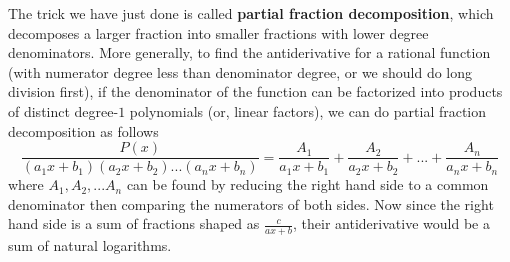 The trick we have just done is called \textbf{partial fraction decomposition}, which decomposes a larger fraction into smaller fractions with lower degree denominators.  More generally, to find the antiderivative for a rational function (with numerator degree less than denominator degree, or we should do long division first), if the denominator of the function can be factorized into products of distinct degree-$1$ polynomials (or, linear factors), we can do partial fraction decomposition as follows
\[\frac{P(x)}{(a_1x+b_1)(a_2x+b_2)...(a_nx+b_n)} = \frac{A_1}{a_1x+b_1} + \frac{A_2}{a_2x+b_2} + ... + \frac{A_n}{a_nx+b_n}\]
where $A_1, A_2, ... A_n$ can be found by reducing the right hand side to a common denominator then comparing the numerators of both sides.  Now since the right hand side is a sum of fractions shaped as $\frac{c}{ax+b}$, their antiderivative would be a sum of natural logarithms.  

